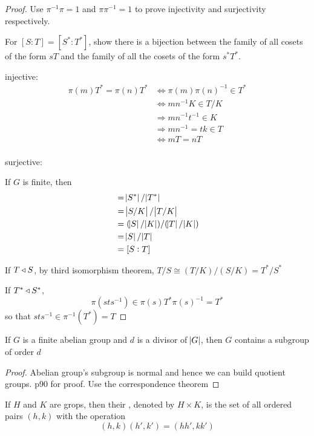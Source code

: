 \documentclass[11pt]{article}
\begin{document}
\begin{proof}
Use \(\pi^{-1}\pi=1\) and \(\pi\pi^{-1}=1\) to prove injectivity and surjectivity
respectively. 

For \([S:T]=[S^*:T^*]\), show there is a bijection between the family of all
cosets of the form \(sT\) and the family of all the cosets of the form
\(s^*T^*\).

injective:
\begin{align*}
\pi(m)T^*=\pi(n)T^*&\Leftrightarrow \pi(m)\pi(n)^{-1}\in T^*\\
&\Leftrightarrow mn^{-1}K\in T/K\\
&\Rightarrow mn^{-1}t^{-1}\in K\\
&\Rightarrow mn^{-1}=tk\in T\\
&\Leftrightarrow mT=nT\\
\end{align*}

surjective:


If \(G\) is finite, then
\begin{align*}
[S^*:T^*]&=\abs{S^*}/\abs{T^*}\\
&=\abs{S/K}/\abs{T/K}\\
&=(\abs{S}/\abs{K})/(\abs{T}/\abs{K})\\
&=\abs{S}/\abs{T}\\
&=[S:T]
\end{align*}

If \(T\triangleleft S\), by third isomorphism theorem, \(T/S\cong (T/K)/(S/K)=T^*/S^*\)

If \(T^*\triangleleft S^*\), 
\begin{equation*}
\pi(sts^{-1})\in \pi(s)T^*\pi(s)^{-1}=T^*
\end{equation*}
so that \(sts^{-1}\in \pi^{-1}(T^*)=T\)
\end{proof}


\begin{proposition}[]
\label{111}
If \(G\) is a finite abelian group and \(d\) is a divisor of \(\abs{G}\), then \(G\)
contains a subgroup of order \(d\)
\end{proposition}

\begin{proof}
Abelian group's subgroup is normal and hence we can build quotient groups.
p90 for proof. Use the correspondence theorem
\end{proof}

\begin{definition}[]
If \(H\) and \(K\) are grops, then their , denoted by \(H\times
   K\), is the set of all ordered pairs \((h,k)\) with the operation
\begin{equation*}
(h,k)(h',k')=(hh',kk')
\end{equation*}
\end{definition}
\end{document}
